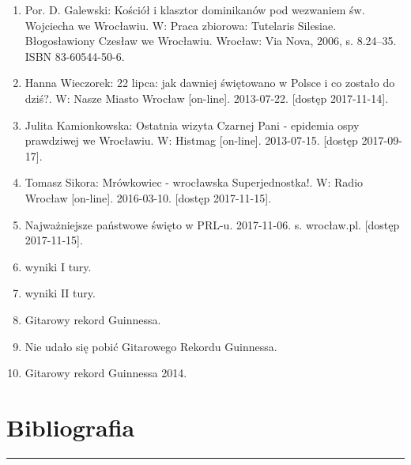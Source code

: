 \documentclass{article}
\begin{document}
\begin{multicols}{3}
\begin{enumerate}
            \item   \hypertarget{24}{ Por. D. Galewski: Kościół i klasztor dominikanów pod wezwaniem św. Wojciecha we Wrocławiu. W: Praca zbiorowa: Tutelaris Silesiae. Błogosławiony Czesław we Wrocławiu. Wrocław: Via Nova, 2006, s. 8.24–35. ISBN 83-60544-50-6.}
            \item   \hypertarget{25}{Hanna Wieczorek: 22 lipca: jak dawniej świętowano w Polsce i co zostało do dziś?. W: Nasze Miasto Wrocław [on-line]. 2013-07-22. [dostęp 2017-11-14].}
            \item   \hypertarget{26}{Julita Kamionkowska: Ostatnia wizyta Czarnej Pani - epidemia ospy prawdziwej we Wrocławiu. W: Histmag [on-line]. 2013-07-15. [dostęp 2017-09-17].}
            \item   \hypertarget{27}{Tomasz Sikora: Mrówkowiec - wrocławska Superjednostka!. W: Radio Wrocław [on-line]. 2016-03-10. [dostęp 2017-11-15].}
            \item   \hypertarget{28}{Najważniejsze państwowe święto w PRL-u. 2017-11-06. s. wrocław.pl. [dostęp 2017-11-15].}
            \item   \hypertarget{29}{wyniki I tury.}
            \item   \hypertarget{30}{wyniki II tury.}
            \item   \hypertarget{31}{Gitarowy rekord Guinnessa.}
            \item   \hypertarget{32}{Nie udało się pobić Gitarowego Rekordu Guinnessa.}
            \item   \hypertarget{33}{Gitarowy rekord Guinnessa 2014.}
        \end{enumerate}
    \end{multicols}

\section{Bibliografia}
\noindent\rule{\textwidth}{0.4pt}
\end{document}
